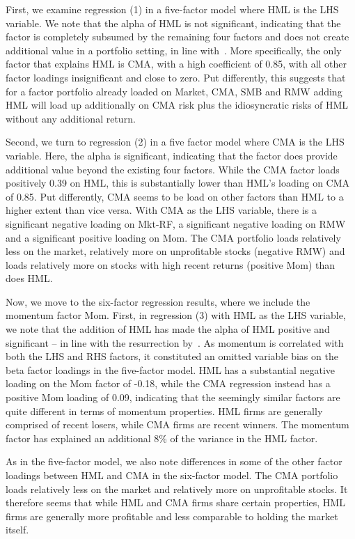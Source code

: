 First, we examine regression (1) in a five-factor model where HML is the LHS variable. We note that the alpha of HML is not significant, indicating that the factor is completely subsumed by the remaining four factors and does not create additional value in a portfolio setting, in line with~\textcite{FF2015}. More specifically, the only factor that explains HML is CMA, with a high coefficient of 0.85, with all other factor loadings insignificant and close to zero. Put differently, this suggests that for a factor portfolio already loaded on Market, CMA, SMB and RMW adding HML will load up additionally on CMA risk plus the idiosyncratic risks of HML without any additional return.

Second, we turn to regression (2) in a five factor model where CMA is the LHS variable. Here, the alpha is significant, indicating that the factor does provide additional value beyond the existing four factors. While the CMA factor loads positively 0.39 on HML, this is substantially lower than HML's loading on CMA of 0.85. Put differently, CMA seems to be load on other factors than HML to a higher extent than vice versa. With CMA as the LHS variable, there is a significant negative loading on Mkt-RF, a significant negative loading on RMW and a significant positive loading on Mom. The CMA portfolio loads relatively less on the market, relatively more on unprofitable stocks (negative RMW) and loads relatively more on stocks with high recent returns (positive Mom) than does HML.

Now, we move to the six-factor regression results, where we include the momentum factor Mom. First, in regression (3) with HML as the LHS variable, we note that the addition of HML has made the alpha of HML positive and significant -- in line with the resurrection by~\textcite{Asness2015}. As momentum is correlated with both the LHS and RHS factors, it constituted an omitted variable bias on the beta factor loadings in the five-factor model. HML has a substantial negative loading on the Mom factor of -0.18, while the CMA regression instead has a positive Mom loading of 0.09, indicating that the seemingly similar factors are quite different in terms of momentum properties. HML firms are generally comprised of recent losers, while CMA firms are recent winners. The momentum factor has explained an additional 8\% of the variance in the HML factor.

As in the five-factor model, we also note differences in some of the other factor loadings between HML and CMA in the six-factor model. The CMA portfolio loads relatively less on the market and relatively more on unprofitable stocks. It therefore seems that while HML and CMA firms share certain properties, HML firms are generally more profitable and less comparable to holding the market itself.

